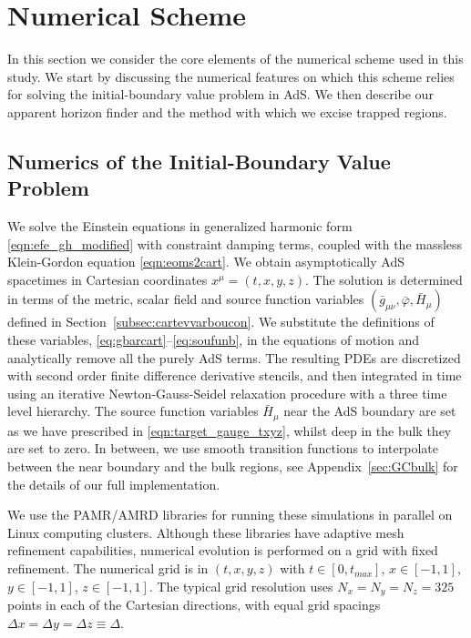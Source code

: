 \documentclass[aps,letterpaper,twocolumn,nofootinbib]{revtex4}
\numberwithin{equation}{section}
\begin{document}
\section{Numerical Scheme}\label{sec:numerical_scheme}

In this section we consider the core elements of the numerical scheme used in this study.
We start by discussing the numerical features on which this scheme relies for solving the initial-boundary value problem in AdS.
We then describe our apparent horizon finder and the method with which we excise trapped regions.


\subsection{Numerics of the Initial-Boundary Value Problem}
\label{sec:numcauprob}
We solve the Einstein equations in generalized harmonic form \eqref{eqn:efe_gh_modified} with constraint damping terms, coupled with the massless Klein-Gordon equation \eqref{eqn:eoms2cart}.
We obtain asymptotically AdS spacetimes in Cartesian coordinates $x^\mu=(t,x,y,z)$. 
The solution is determined in terms of the metric, scalar field and source function variables $(\bar{g}_{\mu\nu},\bar{\varphi},\bar{H}_\mu)$ defined in Section~\ref{subsec:cartevvarboucon}. We substitute the definitions of these variables, \eqref{eq:gbarcart}--\eqref{eq:soufunb}, in the equations of motion and analytically remove all the purely AdS terms.
The resulting PDEs are discretized with second order finite difference derivative stencils, and then integrated in time using an iterative Newton-Gauss-Seidel relaxation procedure with a three time level hierarchy.
The source function variables $\bar{H}_\mu$ near the AdS boundary are set as we have prescribed in \eqref{eqn:target_gauge_txyz}, whilst deep in the bulk they are set to zero. 
In between, we use smooth transition functions to interpolate between the near boundary and the bulk regions, see Appendix~\ref{sec:GCbulk} for the details of our full implementation. 

We use the PAMR/AMRD libraries \cite{PAMR} for running these simulations in parallel on Linux computing clusters.
Although these libraries have adaptive mesh refinement capabilities, numerical evolution is performed on a grid with fixed refinement.
The numerical grid is in $(t,x,y,z)$ with $t \in [0,t_{max}]$, $x \in [-1,1]$, $y \in [-1,1]$, $z \in [-1,1]$.
The typical grid resolution uses $N_x=N_y=N_z=325$ points in each of the Cartesian directions, with equal grid spacings $\Delta x = \Delta y = \Delta z\equiv \Delta$. 
\end{document}
